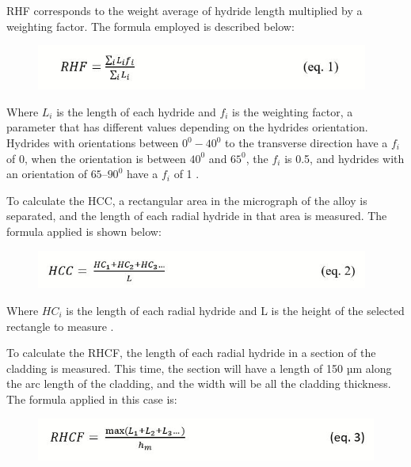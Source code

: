 \documentclass[12pt]{article}
\begin{document}
\noindent
RHF corresponds to the weight average of hydride length multiplied by a weighting factor. The formula employed is described below:

\begin{figure}[h] %
    \raggedleft
    \includegraphics[width=4.3in]{RHF.JPG}
    \label{fig:my_label}
\end{figure}


\noindent
Where $L_i$ is the length of each hydride and $f_i$ is the weighting factor, a parameter that has different values depending on the hydrides orientation. Hydrides with orientations between $0^0-40^0$ to the transverse direction have a $f_i$ of 0, when the orientation is between $40^0$ and $65^0$, the $f_i$ is 0.5, and hydrides with an orientation of $65–90^0$ have a $f_i$ of 1 \cite{COLAS2013586}. 

\noindent
To calculate the HCC, a rectangular area in the micrograph of the alloy is separated, and the length of each radial hydride in that area is measured. The formula applied is shown below:


\begin{figure}[h] %
    \raggedleft
    \includegraphics[width=4.3in]{HCC.JPG}
    \label{fig:my_label}
\end{figure}
\noindent
Where $HC_i$ is the length of each radial hydride and L is the height of the selected rectangle to measure \cite{SIMON2021152817}.

\noindent
To calculate the RHCF, the length of each radial hydride in a section of the cladding is measured. This time, the section will have a length of 150 µm along the arc length of the cladding, and the width will be all the cladding thickness. The formula applied in this case is:

\begin{figure}[h] %
    \raggedleft
    \includegraphics[width=4.5in]{RHCF.JPG}
    \label{fig:my_label}
\end{figure}
\end{document}

